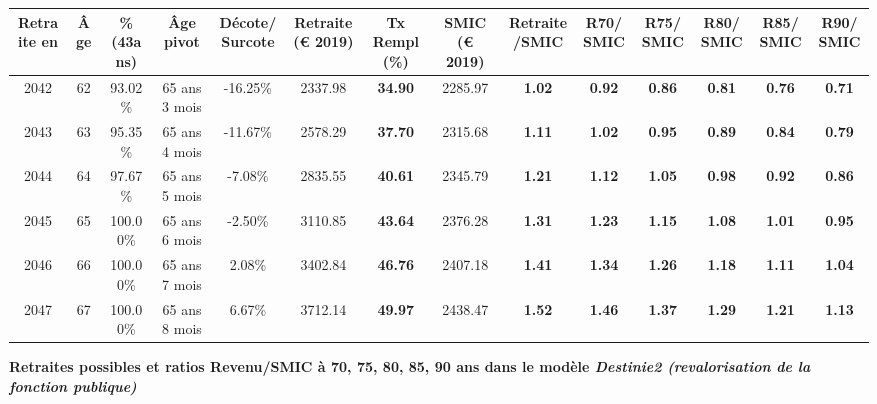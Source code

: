 \begin{adjustbox}{max width=\textwidth} 
\begin{tabular}[htb]{|c|c||c|c|c||c|c||c|c||c|c|c|c|c|} 
\hline 
 Retraite en &  Âge &  \%(43ans) &  Âge pivot &  Décote/Surcote &  Retraite (\euro{} 2019) &  Tx Rempl(\%) &  SMIC (\euro{} 2019) &  Retraite/SMIC &  R70/SMIC &  R75/SMIC &  R80/SMIC &  R85/SMIC &  R90/SMIC \\ 
\hline \hline 
 2042 &  62 &  93.02\% &  65 ans 3 mois &  -16.25\% &  2337.98 &  {\bf 34.90} &  2285.97 &  {\bf 1.02} &  {\bf {\color{red} 0.92}} &  {\bf {\color{red} 0.86}} &  {\bf {\color{red} 0.81}} &  {\bf {\color{red} 0.76}} &  {\bf {\color{red} 0.71}} \\ 
\hline 
 2043 &  63 &  95.35\% &  65 ans 4 mois &  -11.67\% &  2578.29 &  {\bf 37.70} &  2315.68 &  {\bf 1.11} &  {\bf 1.02} &  {\bf {\color{red} 0.95}} &  {\bf {\color{red} 0.89}} &  {\bf {\color{red} 0.84}} &  {\bf {\color{red} 0.79}} \\ 
\hline 
 2044 &  64 &  97.67\% &  65 ans 5 mois &  -7.08\% &  2835.55 &  {\bf 40.61} &  2345.79 &  {\bf 1.21} &  {\bf 1.12} &  {\bf 1.05} &  {\bf {\color{red} 0.98}} &  {\bf {\color{red} 0.92}} &  {\bf {\color{red} 0.86}} \\ 
\hline 
 2045 &  65 &  100.00\% &  65 ans 6 mois &  -2.50\% &  3110.85 &  {\bf 43.64} &  2376.28 &  {\bf 1.31} &  {\bf 1.23} &  {\bf 1.15} &  {\bf 1.08} &  {\bf 1.01} &  {\bf {\color{red} 0.95}} \\ 
\hline 
 2046 &  66 &  100.00\% &  65 ans 7 mois &  2.08\% &  3402.84 &  {\bf 46.76} &  2407.18 &  {\bf 1.41} &  {\bf 1.34} &  {\bf 1.26} &  {\bf 1.18} &  {\bf 1.11} &  {\bf 1.04} \\ 
\hline 
 2047 &  67 &  100.00\% &  65 ans 8 mois &  6.67\% &  3712.14 &  {\bf 49.97} &  2438.47 &  {\bf 1.52} &  {\bf 1.46} &  {\bf 1.37} &  {\bf 1.29} &  {\bf 1.21} &  {\bf 1.13} \\ 
\hline 
\hline 
\end{tabular} 
\end{adjustbox} 
 
 \vspace{0.1cm} 
{\bf \noindent Retraites possibles et ratios Revenu/SMIC à 70, 75, 80, 85, 90 ans dans le modèle \emph{Destinie2 (revalorisation de la fonction publique)}}  
 
